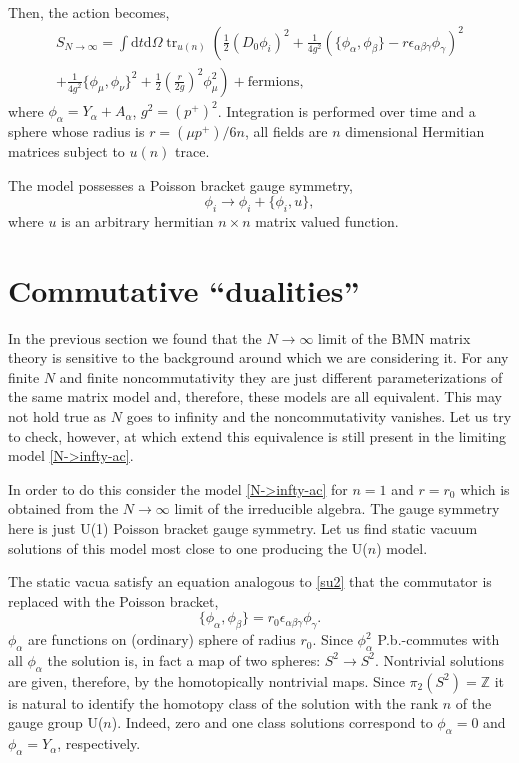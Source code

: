 \documentclass[a4paper]{article}
\newcommand{\dd}{\mathrm{d}}
\newcommand{\tr}{\mathop{\mathrm{tr}}\nolimits}
\begin{document}
Then, the action becomes,
\begin{multline}\label{N->infty-ac}
S_{N\to\infty}=\int\dd t\dd\Omega \tr_{u(n)}\left(\frac12
(D_0\phi_i)^2+
\frac{1}{4g^2}(\{\phi_\alpha,\phi_\beta\}-
r\epsilon_{\alpha\beta\gamma}\phi_\gamma)^2\right.\\
\left.+\frac{1}{4g^2}\{\phi_\mu,\phi_\nu\}^2+
\frac12\left(\frac{r}{2g}\right)^2\phi_\mu^2\right)+\text{fermions},
\end{multline}
where $\phi_\alpha =Y_\alpha+A_\alpha$, $g^2=(p^+)^2$. Integration
is performed over time and a sphere whose radius is $r=(\mu
p^+)/6n$, all fields are $n$ dimensional Hermitian matrices
subject to $u(n)$ trace.

The model possesses a Poisson bracket gauge symmetry,
\begin{equation}\label{pb-gt}
\phi_i\to\phi_i+\{\phi_i,u\},
\end{equation}
where $u$ is an arbitrary hermitian $n\times n$ matrix valued
function.

\section{Commutative ``dualities''}
In the previous section we found that the $N\to\infty$ limit of
the BMN matrix theory is sensitive to the background around which
we are considering it. For any finite $N$ and finite
noncommutativity they are just different parameterizations of the
same matrix model and, therefore, these models are all equivalent.
This may not hold true as $N$ goes to infinity and the
noncommutativity vanishes. Let us try to check, however, at which
extend this equivalence is still present in the limiting model
\eqref{N->infty-ac}.

In order to do this consider the model \eqref{N->infty-ac} for
$n=1$ and $r=r_0$ which is obtained from the $N\to\infty$ limit of
the irreducible algebra. The gauge symmetry here is just U(1)
Poisson bracket gauge symmetry. Let us find static vacuum
solutions of this model most close to one producing the U($n$)
model.

The static vacua satisfy an equation analogous to \eqref{su2} that
the commutator is replaced with the Poisson bracket,
\begin{equation}\label{pbem}
\{\phi_\alpha,\phi_\beta\}=r_0\epsilon_{\alpha\beta\gamma}\phi_\gamma.
\end{equation}
$\phi_\alpha$ are functions on (ordinary) sphere of radius
$r_0$. Since $\phi_\alpha^2$ P.b.-commutes with all $\phi_\alpha$ the
solution is, in fact a map of two spheres: $S^2\to S^2$. Nontrivial
solutions are given, therefore, by the homotopically nontrivial
maps. Since $\pi_2(S^2)=\mathbb{Z}$ it is natural to identify the
homotopy class of the solution with the rank $n$ of the gauge group U($n$). Indeed,
zero and one class solutions correspond to $\phi_\alpha=0$ and
$\phi_\alpha=Y_\alpha$, respectively.
\end{document}
